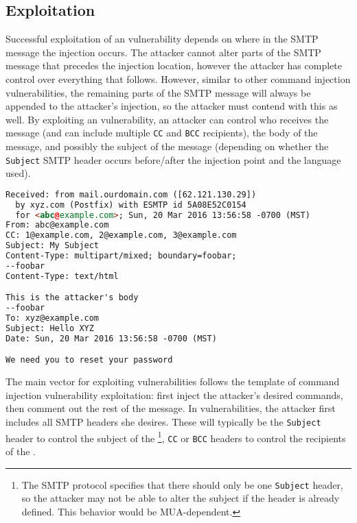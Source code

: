 \subsection{Exploitation}
\label{exploitation}
Successful exploitation of an \ehi vulnerability depends on where in
the SMTP message the injection occurs. The attacker cannot alter parts
of the SMTP message that precedes the injection location, however the
attacker has complete control over everything that follows. However,
similar to other command injection vulnerabilities, the remaining
parts of the SMTP message will always be appended to the attacker's
injection, so the attacker must contend with this as well. By
exploiting an \ehi vulnerability, an attacker can control who receives
the message (and can include multiple \texttt{CC} and \texttt{BCC}
recipients), the body of the message, and possibly the subject of the
message (depending on whether the \texttt{Subject} SMTP header occurs
before/after the injection point and the language used).

\begin{lstlisting}[language=HTML,caption={Exploiting the \ehi
      vulnerability in Listing~\ref{code:phpemi} to control the
      recipients, subject, and body of the SMTP message.},label={code:ehiexploit}, float]
Received: from mail.ourdomain.com ([62.121.130.29])
  by xyz.com (Postfix) with ESMTP id 5A08E52C0154
  for <abc@example.com>; Sun, 20 Mar 2016 13:56:58 -0700 (MST)
From: abc@example.com
CC: 1@example.com, 2@example.com, 3@example.com
Subject: My Subject
Content-Type: multipart/mixed; boundary=foobar;
--foobar
Content-Type: text/html

This is the attacker's body
--foobar
To: xyz@example.com
Subject: Hello XYZ
Date: Sun, 20 Mar 2016 13:56:58 -0700 (MST)

We need you to reset your password
\end{lstlisting}

The main vector for exploiting \ehi vulnerabilities follows the
template of command injection vulnerability exploitation: first inject
the attacker's desired commands, then comment out the rest of the
message. In \ehi vulnerabilities, the attacker first includes all SMTP
headers she desires. These will typically be the \texttt{Subject}
header to control the subject of the \email\footnote{The SMTP protocol
  specifies that there should only be one \texttt{Subject} header, so
  the attacker may not be able to alter the subject if the header is
  already defined. This behavior would be MUA-dependent.}, \texttt{CC}
or \texttt{BCC} headers to control the recipients of the \email.


